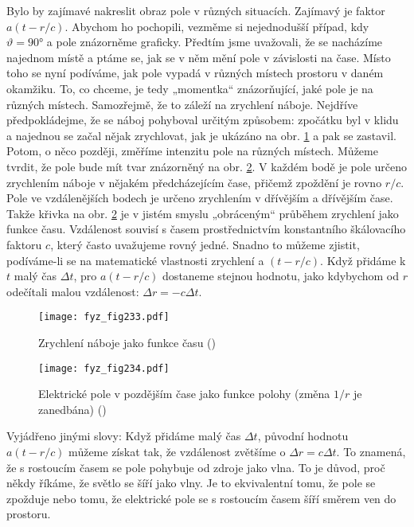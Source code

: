 {    Bylo by zajímavé nakreslit obraz pole v různých situacích. Zajímavý je faktor \(a(t-r/c)\). 
    Abychom ho pochopili, vezměme si nejednodušší případ, kdy \(\vartheta=\ang{90}\) a pole 
    znázorněme graficky. Předtím jsme uvažovali, že se nacházíme najednom místě a ptáme se, jak se 
    v něm mění pole v závislosti na čase. Místo toho se nyní podíváme, jak pole vypadá v různých 
    místech prostoru v daném okamžiku. To, co chceme, je tedy „momentka“ znázorňující, jaké pole je 
    na různých místech. Samozřejmě, že to záleží na zrychlení náboje. Nejdříve předpokládejme, že 
    se náboj pohyboval určitým způsobem: zpočátku byl v klidu a najednou se začal nějak zrychlovat, 
    jak je ukázáno na obr. \ref{fyz:fig233} a pak se zastavil. Potom, o něco později, změříme 
    intenzitu pole na různých místech. Můžeme tvrdit, že pole bude mít tvar znázorněný na obr. 
    \ref{fyz:fig234}. V každém bodě je pole určeno zrychlením náboje v nějakém předcházejícím čase, 
    přičemž zpoždění je rovno \(r/c\). Pole ve vzdálenějších bodech je určeno zrychlením v 
    dřívějším a dřívějším čase. Takže křivka na obr. \ref{fyz:fig234} je v jistém smyslu 
    „obráceným“ průběhem zrychlení jako funkce času. Vzdálenost souvisí s časem prostřednictvím 
    konstantního škálovacího faktoru \(c\), který často uvažujeme rovný jedné. Snadno to můžeme 
    zjistit, podíváme-li se na matematické vlastnosti zrychlení a \((t-r/c)\). Když přidáme k \(t\) 
    malý čas \(\Delta t\), pro \(a(t - r/c)\) dostaneme stejnou hodnotu, jako kdybychom od \(r\) 
    odečítali malou vzdálenost: \(\Delta r = -c\Delta t\).
    
    \begin{figure}[ht!] %
      \centering
      \texttt{[image: fyz\_fig233.pdf]}
      \caption{Zrychlení náboje jako funkce času
               (\cite[s.~380]{Feynman01})}
      \label{fyz:fig233}
    \end{figure}

    \begin{figure}[ht!] %
      \centering
      \texttt{[image: fyz\_fig234.pdf]}
      \caption{Elektrické pole v pozdějším čase jako funkce polohy (změna \(1/r\) je zanedbána)
               (\cite[s.~380]{Feynman01})}
      \label{fyz:fig234}
    \end{figure}
    
    Vyjádřeno jinými slovy: Když přidáme malý čas \(\Delta t\), původní hodnotu \(a(t - r/c)\) 
    můžeme získat tak, že vzdálenost zvětšíme o \(\Delta r = c\Delta t\). To znamená, že s 
    rostoucím časem se pole pohybuje od zdroje jako vlna. To je důvod, proč někdy říkáme, že světlo 
    se šíří jako vlny. Je to ekvivalentní tomu, že pole se zpožduje nebo tomu, že elektrické pole 
    se s rostoucím časem šíří směrem ven do prostoru. 
    
}
